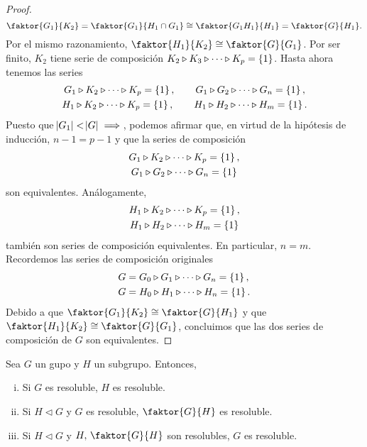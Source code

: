 \begin{proof}
    \[
        \faktor{G_1}{K_2} = \faktor{G_1}{H_1 \cap G_1} \cong \faktor{G_1H_1}{H_1} = \faktor{G}{H_1}.
    \]
    Por el mismo razonamiento, $\faktor{H_1}{K_2} \cong \faktor{G}{G_1}$. Por ser finito,
    $K_2$ tiene serie de composición $K_2 \triangleright K_3 \triangleright \cdots \triangleright K_p =\left\{1\right\}$.
    Hasta ahora tenemos las series
    \begin{gather*}
        G_1 \triangleright K_2 \triangleright \cdots \triangleright K_p = \left\{1\right\}, \quad \quad
        G_1 \triangleright G_2 \triangleright \cdots \triangleright G_n = \left\{ 1 \right\}, \\
        H_1 \triangleright K_2 \triangleright \cdots \triangleright K_p = \left\{1\right\}, \quad \quad
        H_1 \triangleright H_2 \triangleright \cdots \triangleright H_m = \left\{ 1 \right\}.
    \end{gather*}
    Puesto que $\abs{G_1} < \abs{G} \implies$, podemos afirmar que, en virtud de la hipótesis de inducción, $n-1 = p-1$ y que
    la series de composición
    \begin{gather*}
        G_1 \triangleright K_2 \triangleright \cdots \triangleright K_p=\left\{ 1\right\},\\
        G_1 \triangleright G_2 \triangleright \cdots \triangleright G_n = \left\{ 1 \right\}
    \end{gather*}
    son equivalentes. Análogamente,
    \begin{gather*}
        H_1 \triangleright K_2 \triangleright \cdots \triangleright K_p=\left\{ 1\right\},\\
        H_1 \triangleright H_2 \triangleright \cdots \triangleright H_m = \left\{ 1 \right\}
    \end{gather*}
    también son series de composición equivalentes. En particular, $n=m$. Recordemos las series de composición originales
    \[
        \begin{aligned}
            G &= G_0 \triangleright G_1 \triangleright \cdots \triangleright G_n = \left\{1\right\}, \\
            G &= H_0 \triangleright H_1 \triangleright \cdots \triangleright H_n = \left\{1\right\}.
        \end{aligned}
    \]
    Debido a que $\faktor{G_1}{K_2} \cong \faktor{G}{H_1}$ y que $\faktor{H_1}{K_2} \cong \faktor{G}{G_1}$, concluimos que
    las dos series de composición de $G$ son equivalentes.
\end{proof}

\begin{prop}\label{prop:resoluble}
    Sea $G$ un gupo y $H$ un subgrupo. Entonces,
    \begin{enumerate}[i)]
        \item Si $G$ es resoluble, $H$ es resoluble.
        \item Si $H \triangleleft G$ y $G$ es resoluble, $\faktor{G}{H}$ es resoluble.
        \item Si $H \triangleleft G$ y $H, \, \faktor{G}{H}$ son resolubles, $G$ es resoluble.
    \end{enumerate}
\end{prop}

